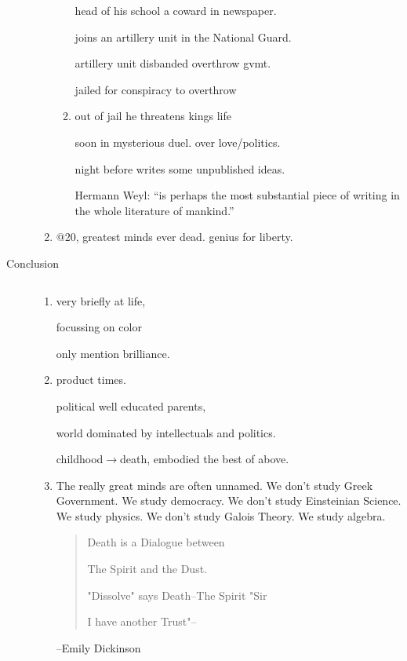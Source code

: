 \documentclass[letterpaper]{article}
\begin{document}
\begin{multicols}{2}
\begin{description}
\begin{enumerate}
\begin{enumerate}
    head of his school a coward in newspaper.

    joins an artillery unit in the National Guard.

    artillery unit disbanded overthrow gvmt.
    
    jailed for conspiracy to overthrow
    \item
    out of jail he threatens kings life

    soon in mysterious duel.  over love/politics.

    night before writes some unpublished ideas.

    \cite{abstract} Hermann Weyl: ``is perhaps the most substantial piece of writing in the whole literature of mankind.''
  \end{enumerate}
  \renewcommand{\labelenumi}{\emph{Transition}:}
  \item
  @20, greatest minds ever dead. genius for liberty.
  \renewcommand{\labelenumi}{\Roman{enumi}}
\end{enumerate}
\item[Conclusion]$\quad$
\begin{enumerate}
  \item
  very briefly at life,

  focussing on color

  only mention brilliance.
  \item
  product times.

  political well educated parents,

  world dominated by intellectuals and politics.

  childhood$\to$death, embodied the best of above.
  \item
  The really great minds are often unnamed. We don't study Greek Government. We study democracy. We don't study Einsteinian Science. We study physics. We don't study Galois Theory. We study algebra.

\begin{quote}
Death is a Dialogue between

The Spirit and the Dust.

"Dissolve" says Death--The Spirit "Sir

I have another Trust"--
\end{quote}--Emily Dickinson
\end{enumerate}
\end{description}
\end{multicols}

\newpage


\end{document}
